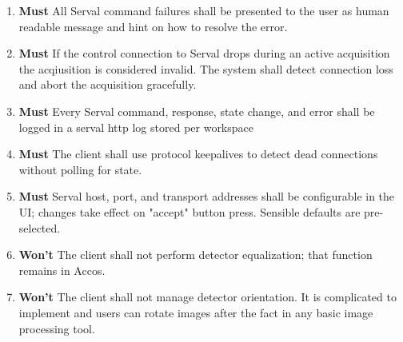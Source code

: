 \documentclass[10pt]{article}
\newcommand{\PriorityTag}[2]{%
    \colorbox{#2!25}{\footnotesize\textsf{\textbf{#1}}}\hspace{0.6em}}
\newcommand{\must}{\leavevmode\PriorityTag{Must}{green}}
\newcommand{\wont}{\leavevmode\PriorityTag{Won't}{red}}
\newcounter{reqgrp}[section] %
\newcounter{reqno}
\newcommand{\reqprefix}{GEN}
\newenvironment{requirements}[1]{%
    \renewcommand{\reqprefix}{#1}%
    \refstepcounter{reqgrp}%
    \setcounter{reqno}{0}%
    \begin{enumerate}[leftmargin=*]
    }{\end{enumerate}}
\begin{document}
\begin{requirements}{SRV}
        \item \must {}
        {All Serval command failures shall be presented to the user as human readable message and hint on how to resolve the error.}

        \item \must {}
        {If the control connection to Serval drops during an active acquisition the acqiusition is considered invalid. The system shall detect connection loss and abort the acquisition gracefully.}

        \item \must {}
        {Every Serval command, response, state change, and error shall be logged in a serval http log stored per workspace}

        \item \must {}
        {The client shall use protocol keepalives to detect dead connections without polling for state.}

        \item \must {}
        {Serval host, port, and transport addresses shall be configurable in the UI; changes take effect on "accept" button press. Sensible defaults are pre-selected.}

        \item \wont {}
        {The client shall not perform detector equalization; that function remains in Accos.}

        \item \wont {}
        {The client shall not manage detector orientation. It is complicated to implement and users can rotate images after the fact in any basic image processing tool.}

    \end{requirements}
\end{document}
